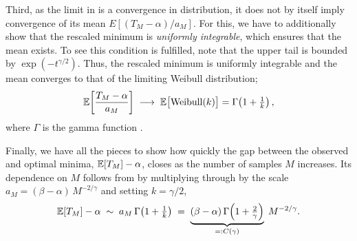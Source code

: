 Third, as the limit in  is a convergence in distribution, it does not by itself imply convergence of its mean $E[(T_M-\alpha)/a_M]$. For this, we have to additionally show that the rescaled minimum is \emph{uniformly integrable}, which ensures that the mean exists. To see this condition is fulfilled, note that the upper tail is bounded by $\exp(-t^{\gamma/2})$.
Thus, the rescaled minimum is uniformly integrable and the mean converges to that of the limiting Weibull distribution;
\begin{equation}\label{eq:sample-min-rescaled-mean}
    \mathbb{E}\!\left[\frac{T_M - \alpha}{a_M}\right] \;\longrightarrow\; \mathbb{E}\bigl[\operatorname{Weibull}(k)\bigr] = \Gamma\!\left(1 + \tfrac{1}{k}\right),
\end{equation}
 where $\Gamma$ is the gamma function \citep{johnson1994continuous}.


Finally, we have all the pieces to show how quickly the gap between the observed and optimal minima, $\mathbb{E}[T_M] - \alpha$, closes as the number of samples $M$ increases. Its dependence on $M$ follows from  by multiplying through by the scale $a_M = (\beta - \alpha)\, M^{-2/\gamma}$ and setting $k = \gamma/2$,
%
\begin{equation}\label{eq:sample-min-mean}
    \mathbb{E}[T_M] - \alpha \;\sim\;
    a_M \, \Gamma\!\left(1 + \tfrac{1}{k}\right) \;=\; \underbrace{(\beta - \alpha)\, \Gamma\!\left(1 + \tfrac{2}{\gamma}\right)}_{=: C(\gamma)} \; M^{-2/\gamma}.
\end{equation}

